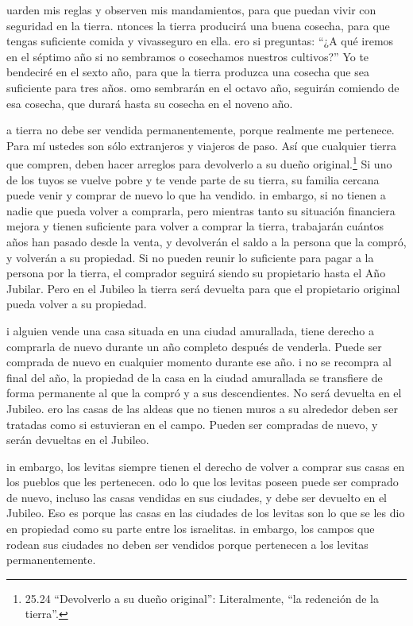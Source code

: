  uarden mis reglas y observen mis mandamientos, para que
puedan vivir con seguridad en la tierra.  ntonces la tierra
producirá una buena cosecha, para que tengas suficiente comida y
vivasseguro en ella.  ero si preguntas: ``¿A qué iremos en
el séptimo año si no sembramos o cosechamos nuestros cultivos?''
 Yo te bendeciré en el sexto año, para que la tierra
produzca una cosecha que sea suficiente para tres años. 
omo sembrarán en el octavo año, seguirán comiendo de esa cosecha, que
durará hasta su cosecha en el noveno año.

 a tierra no debe ser vendida permanentemente, porque
realmente me pertenece. Para mí ustedes son sólo extranjeros y viajeros
de paso.  Así que cualquier tierra que compren, deben hacer
arreglos para devolverlo a su dueño original.\footnote{25.24
  ``Devolverlo a su dueño original'': Literalmente, ``la redención de la
  tierra''.}  Si uno de los tuyos se vuelve pobre y te
vende parte de su tierra, su familia cercana puede venir y comprar de
nuevo lo que ha vendido.  in embargo, si no tienen a nadie
que pueda volver a comprarla, pero mientras tanto su situación
financiera mejora y tienen suficiente para volver a comprar la tierra,
 trabajarán cuántos años han pasado desde la venta, y
devolverán el saldo a la persona que la compró, y volverán a su
propiedad.  Si no pueden reunir lo suficiente para pagar a
la persona por la tierra, el comprador seguirá siendo su propietario
hasta el Año Jubilar. Pero en el Jubileo la tierra será devuelta para
que el propietario original pueda volver a su propiedad.

 i alguien vende una casa situada en una ciudad amurallada,
tiene derecho a comprarla de nuevo durante un año completo después de
venderla. Puede ser comprada de nuevo en cualquier momento durante ese
año.  i no se recompra al final del año, la propiedad de la
casa en la ciudad amurallada se transfiere de forma permanente al que la
compró y a sus descendientes. No será devuelta en el Jubileo.
 ero las casas de las aldeas que no tienen muros a su
alrededor deben ser tratadas como si estuvieran en el campo. Pueden ser
compradas de nuevo, y serán devueltas en el Jubileo.

 in embargo, los levitas siempre tienen el derecho de
volver a comprar sus casas en los pueblos que les pertenecen.
 odo lo que los levitas poseen puede ser comprado de nuevo,
incluso las casas vendidas en sus ciudades, y debe ser devuelto en el
Jubileo. Eso es porque las casas en las ciudades de los levitas son lo
que se les dio en propiedad como su parte entre los israelitas.
 in embargo, los campos que rodean sus ciudades no deben
ser vendidos porque pertenecen a los levitas permanentemente.

